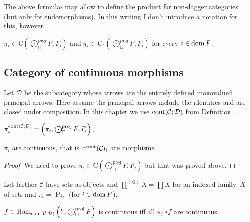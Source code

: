 \begin{rem}
  The above formulas may allow to define the product for non-dagger categories
  (but only for endomorphisms). In this writing I don't introduce a notation
  for this, however.
\end{rem}

\begin{cor}
  $\pi_i \in \mathrm{C} \left( \bigodot^{\text{proj}}_{\sqcap} F , F_i \right)$ and
  $\pi_i \in \mathrm{C}_{\ast} \left( \bigodot^{\text{proj}}_{\sqcup} F , F_i \right)$
  for every $i \in \operatorname{dom} F$.
\end{cor}

\subsection{Category of continuous morphisms}

Let $\mathcal D$ be the subcategory whose arrows are the
entirely defined monovalued principal arrows. Here assume the
principal arrows include the identities and are closed under
composition. In this chapter we use
$\operatorname{cont}(\mathcal C;\mathcal D)$ from
Definition~.

\begin{defn}
  $\pi^{\operatorname{cont}(\mathcal C;\mathcal D)}_i = \left(\pi_i,\bigodot^{\text{proj}}_{\sqcap}F,F_i\right)$.
\end{defn}

\begin{prop}
  $\pi_i$ are continuous, that is $\pi^{\operatorname{cont}}
  (\mathcal{C})_i$ are morphisms.
\end{prop}

\begin{proof}
  We need to prove $\pi_i \in \mathrm{C} \left( \bigodot^{\text{proj}}_{\sqcap} F , F_i \right)$
  but that was proved above.
\end{proof}

Let further $\mathcal{C}$ have sets as objects and $\prod^{(Q)}X=\prod X$ for an indexed family~$X$ of sets and $\pi_i = \Pr_i$ (for $i \in \operatorname{dom} F$).

\begin{lem}
  $f \in \operatorname{Hom}_{\operatorname{cont}(\mathcal C;\mathcal D)} \left( Y ,
  \bigodot^{\text{proj}}_{\sqcap} F \right)$ is continuous iff all $\pi_i \circ f$ are continuous.
\end{lem}

